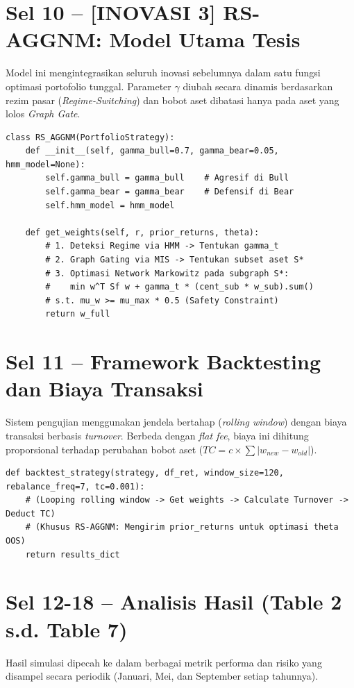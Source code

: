 \documentclass[12pt,a4paper]{article}
\begin{document}
\section{Sel 10 -- [INOVASI 3] RS-AGGNM: Model Utama Tesis}
Model ini mengintegrasikan seluruh inovasi sebelumnya dalam satu fungsi optimasi portofolio tunggal. Parameter $\gamma$ diubah secara dinamis berdasarkan rezim pasar (\textit{Regime-Switching}) dan bobot aset dibatasi hanya pada aset yang lolos \textit{Graph Gate}.

\begin{lstlisting}[caption={Framework Model RS-AGGNM}]
class RS_AGGNM(PortfolioStrategy):
    def __init__(self, gamma_bull=0.7, gamma_bear=0.05, hmm_model=None):
        self.gamma_bull = gamma_bull    # Agresif di Bull
        self.gamma_bear = gamma_bear    # Defensif di Bear
        self.hmm_model = hmm_model

    def get_weights(self, r, prior_returns, theta):
        # 1. Deteksi Regime via HMM -> Tentukan gamma_t
        # 2. Graph Gating via MIS -> Tentukan subset aset S*
        # 3. Optimasi Network Markowitz pada subgraph S*:
        #    min w^T Sf w + gamma_t * (cent_sub * w_sub).sum()
        # s.t. mu_w >= mu_max * 0.5 (Safety Constraint)
        return w_full
\end{lstlisting}

\section{Sel 11 -- Framework Backtesting dan Biaya Transaksi}
Sistem pengujian menggunakan jendela bertahap (\textit{rolling window}) dengan biaya transaksi berbasis \textit{turnover}. Berbeda dengan \textit{flat fee}, biaya ini dihitung proporsional terhadap perubahan bobot aset ($TC = c \times \sum |w_{new} - w_{old}|$).

\begin{lstlisting}[caption={Fungsi simulasi backtest dengan turnover-based TC}]
def backtest_strategy(strategy, df_ret, window_size=120, rebalance_freq=7, tc=0.001):
    # (Looping rolling window -> Get weights -> Calculate Turnover -> Deduct TC)
    # (Khusus RS-AGGNM: Mengirim prior_returns untuk optimasi theta OOS)
    return results_dict
\end{lstlisting}

\section{Sel 12-18 -- Analisis Hasil (Table 2 s.d. Table 7)}
Hasil simulasi dipecah ke dalam berbagai metrik performa dan risiko yang disampel secara periodik (Januari, Mei, dan September setiap tahunnya).
\end{document}
